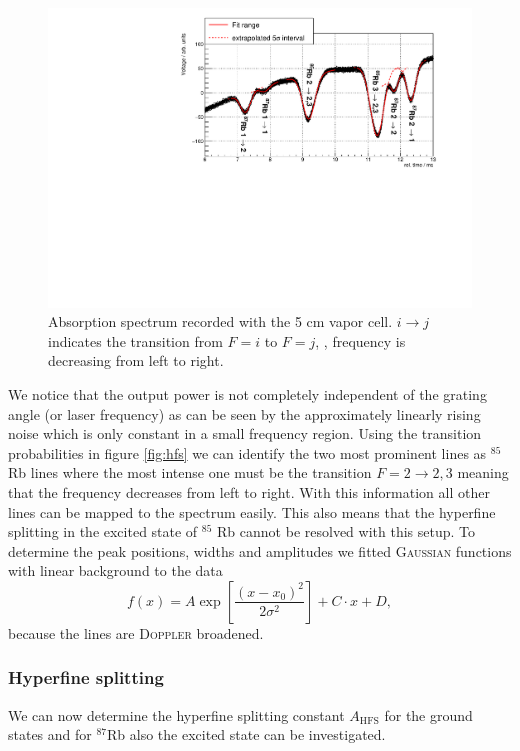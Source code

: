 \documentclass[11pt,a4paper,notitlepage]{scrartcl}
\begin{document}
\begin{figure}[htbp]
	\centering
	\includegraphics[width=\linewidth]{figs/measurements/linear.pdf}
	\caption{Absorption spectrum recorded with the 5 cm vapor cell. $i\to j $ indicates the transition from $F=i$ to $F=j$, , frequency is decreasing from left to right.}
	\label{fig:linearfit}
\end{figure}
We notice that the output power is not completely independent of the grating angle (or laser frequency) as can be seen by the approximately linearly rising noise which is only constant in a small frequency region. Using the transition probabilities in figure \ref{fig:hfs} we can identify the two most prominent lines as $^{85}$ Rb lines where the most intense one must be the transition $F=2\to2,3$ meaning that the frequency decreases from left to right. With this information all other lines can be mapped to the spectrum easily. This also means that the hyperfine splitting in the excited state of $^{85}$ Rb cannot be resolved with this setup. To determine the peak positions, widths and amplitudes we fitted \textsc{Gaussian} functions with linear background to the data 
$$f(x)=A\exp\left[\frac{(x-x_0)^2}{2\sigma^2}\right]+C\cdot x +D,$$
because the lines are \textsc{Doppler} broadened.

\subsubsection{Hyperfine splitting}
We can now determine the hyperfine splitting constant $A_\text{HFS}$ for the ground states and for $^{87}$Rb also the excited state can be investigated.
\end{document}
